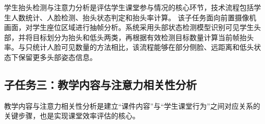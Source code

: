 \documentclass[12pt,hyperref,a4paper,UTF8]{ctexart}
\begin{document}
学生抬头检测与注意力分析是评估学生课堂参与情况的核心环节，技术流程包括学生人数统计、人脸检测、抬头状态判定和抬头率计算。
该子任务面向前置摄像机画面，对学生座位区域进行抽帧分析。系统采用头部状态检测模型识别可见学生头部，并将目标划分为抬头和低头两类，再根据有效检测目标数量计算当前帧抬头率。与只统计人脸可见数量的方法相比，该流程能够在部分侧脸、远距离和低头状态下保留更多头部姿态信息。




\subsection{子任务三：教学内容与注意力相关性分析}

教学内容与注意力相关性分析是建立“课件内容”与“学生课堂行为”之间对应关系的关键步骤，也是实现课堂效率评估的核心。



\end{document}
